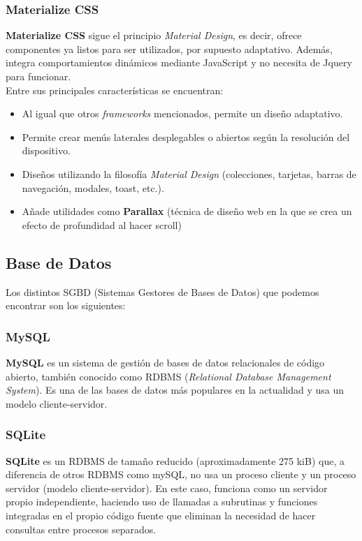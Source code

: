     \subsubsection{Materialize CSS}
    \textbf{Materialize CSS} \cite{materialize-css} sigue el principio \textit{Material Design},
    es decir, ofrece componentes ya listos para ser utilizados, por supuesto adaptativo.
    Además, integra comportamientos dinámicos mediante JavaScript y no necesita de Jquery para
    funcionar.\\

    Entre sus principales características se encuentran:
        
        \begin{itemize}
            \item Al igual que otros \textit{frameworks} mencionados, permite un diseño
            adaptativo.
            \item Permite crear menús laterales desplegables o abiertos según la resolución
            del dispositivo.
            \item Diseños utilizando la filosofía \textit{Material Design} (colecciones,
            tarjetas, barras de navegación, modales, toast, etc.).
            \item Añade utilidades como \textbf{Parallax} (técnica de diseño web en la que
            se crea un efecto de profundidad al hacer scroll)
        \end{itemize}

\subsection{Base de Datos}
Los distintos SGBD (Sistemas Gestores de Bases de Datos) que podemos encontrar son los
siguientes:

    \subsubsection{MySQL}
    \textbf{MySQL} \cite{mysql} es un sistema de gestión de bases de datos relacionales de
    código abierto, también conocido como RDBMS (\textit{Relational Database Management
    System}). Es una de las bases de datos más populares en la actualidad y usa un modelo
    cliente-servidor.
    

    \subsubsection{SQLite}
    \textbf{SQLite} \cite{sqlite} es un RDBMS de tamaño reducido (aproximadamente 275 kiB)
    que, a diferencia de otros RDBMS como mySQL, no usa un proceso cliente y un proceso
    servidor (modelo cliente-servidor). En este caso, funciona como un servidor
    propio independiente, haciendo uso de llamadas a subrutinas y funciones integradas en el
    propio código fuente que eliminan la necesidad de hacer consultas entre procesos
    separados.


